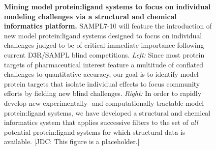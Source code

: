 \documentclass[11pt]{article}
\begin{document}
\begin{figure}[h]
\begin{centering}

\end{centering}
\vspace{0.1in}
\caption{\footnotesize {\bf Mining model protein:ligand systems to focus on individual modeling challenges via a structural and chemical informatics platform.}
SAMPL7-10 will feature the introduction of new model protein:ligand systems designed to focus on individual challenges judged to be of critical immediate importance following current D3R/SAMPL blind competitions.
\emph{Left:} Since most protein targets of pharmaceutical interest feature a multitude of conflated challenges to quantitative accuracy, our goal is to identify model protein targets that isolate individual effects to focus community efforts by fielding new blind challenges.
\emph{Right:} In order to rapidly develop new experimentally- and computationally-tractable model protein:ligand systems, we have developed a structural and chemical informatics system that applies successive filters to the set of \emph{all} potential protein:ligand systems for which structural data is available.
{\color{red}[JDC: This figure is a placeholder.]}
\label{figure:mining-for-model-systems}}
\end{figure}
\end{document}
